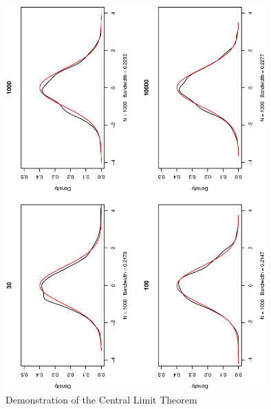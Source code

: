 \begin{figure}[ht]
\centering
\includegraphics[width=10cm, angle=270]{Q1_5plot.eps}
\caption{Demonstration of the Central Limit Theorem}
\label{fig3}
\end{figure}


